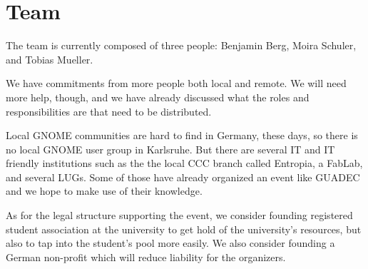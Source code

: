 
\newpage


\vspace*{9.5cm}


\section{Team}

The team is currently composed of three people:
Benjamin Berg, Moira Schuler, and Tobias Mueller.

We have commitments from more people both local and remote.
We will need more help, though, and we have already discussed
what the roles and responsibilities are that need to be distributed.

Local GNOME communities are hard to find in Germany, these days,
so there is no local GNOME user group in Karlsruhe.
But there are several IT and IT friendly institutions such as the
the local CCC branch called Entropia, a FabLab, and several LUGs.
Some of those have already organized an event like GUADEC and
we hope to make use of their knowledge.

As for the legal structure supporting the event,
we consider founding registered student association at
the university to get hold of the university's resources,
but also to tap into the student's pool more easily.
We also consider founding a German non-profit which will reduce
liability for the organizers.
